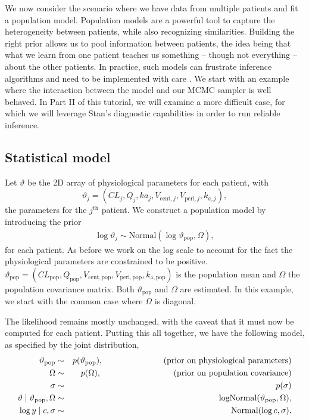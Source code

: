 
We now consider the scenario where we have data from multiple patients and fit a population model.
Population models are a powerful tool to capture the heterogeneity between patients, while also recognizing similarities.
Building the right prior allows us to pool information between patients, the idea being that what we learn from one patient teaches us something -- though not everything -- about the other patients.
In practice, such models can frustrate inference algorithms and need to be implemented with care \cite[e.g.][]{Betancourt:2013}.
We start with an example where the interaction between the model and our MCMC sampler is well behaved.
In Part II of this tutorial, we will examine a more difficult case, for which we will leverage Stan's diagnostic capabilities in order to run reliable inference.

\subsection{Statistical model} \label{sec:twoCptPop_stat}

Let $\vartheta$ be the 2D array of physiological parameters for each patient,
with
\begin{equation*}
  \vartheta_j = (CL_j, Q_j, ka_j, V_{\mathrm{cent}, j}, V_{\mathrm{peri}, j}, k_{a, j}),
\end{equation*} 
the parameters for the $j^\mathrm{th}$ patient.
We construct a population model by introducing the prior 
\begin{eqnarray*}
  \log \vartheta_j \sim \mathrm{Normal} (\log \vartheta_\mathrm{pop}, \Omega),
\end{eqnarray*}
for each patient.
As before we work on the log scale to account for the fact the physiological parameters are constrained to be positive.
$\vartheta_\mathrm{pop} = (CL_\mathrm{pop}, Q_\mathrm{pop}, V_\mathrm{cent, pop}, V_\mathrm{peri, pop}, k_\mathrm{a, pop})$ is the population mean and $\Omega$ the population covariance matrix.
Both $\vartheta_\mathrm{pop}$ and $\Omega$ are estimated.
In this example, we start with the common case where $\Omega$ is diagonal.

The likelihood remains mostly unchanged, with the caveat that it must now be computed for each patient.
Putting this all together, we have the following model, as specified by the joint distribution,
\begin{eqnarray*}
  \vartheta_\mathrm{pop} & \sim & p(\vartheta_\mathrm{pop}), \hspace{1in} \text{(prior on physiological parameters)} \\
  \Omega & \sim & p(\Omega), \hspace{1.2in} \text{(prior on population covariance)} \\
  \sigma & \sim & p(\sigma) \\
  \vartheta \mid \vartheta_\mathrm{pop}, \Omega  & \sim  & \mathrm{logNormal}(\vartheta_\mathrm{pop}, \Omega), \\
  \log y \mid c, \sigma & \sim & \mathrm{Normal}(\log c, \sigma).
\end{eqnarray*}

